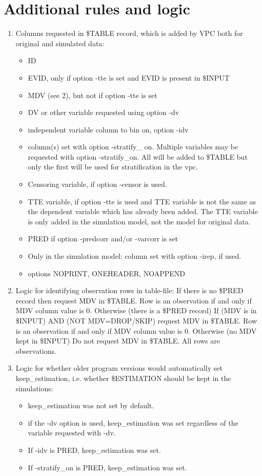 \section{Additional rules and logic}

\begin{enumerate}
	\item Columns requested in \$TABLE record, which is added by VPC both for original and simulated data:
	\begin{itemize}
		\item ID
		\item EVID, only if option -tte is set and EVID is present in \$INPUT
		\item MDV (see 2), but not if option -tte is set
		\item DV or other variable requested using option -dv
		\item independent variable column to bin on, option -idv
		\item column(s) set with option  -stratify\_ on. Multiple variables may be requested with option -stratify\_on. All will be added to \$TABLE but only the first will be used for stratification in the vpc.
		\item Censoring variable, if option -censor is used.
		\item TTE variable, if option -tte is used and TTE variable is not the same as the dependent variable which has already been added. The TTE variable is only added in the simulation model, not the model for original data.
        \item PRED if option -predcorr and/or -varcorr is set
        \item Only in the simulation model: column set with option -irep, if used.
		\item options NOPRINT, ONEHEADER, NOAPPEND
	\end{itemize}
	\item Logic for identifying observation rows  in table-file:
If there is no \$PRED record
	then request MDV in \$TABLE. Row is an observation if and only if MDV column value is 0.
Otherwise (there is a \$PRED record)
	If (MDV is in \$INPUT) AND (NOT MDV=DROP/SKIP)
		request MDV in \$TABLE. Row is an observation if and only if MDV column value is 0.
	Otherwise (no MDV kept in \$INPUT)
		Do not request MDV in \$TABLE. All rows are observations.
	\item Logic for whether older program versions would automatically set keep\_estimation, i.e. whether \$ESTIMATION should be kept in the simulations:
	\begin{itemize}
		\item keep\_estimation was not set by default.
		\item if the -dv option is used, keep\_estimation was set regardless of the variable requested with -dv.
		\item If -idv is PRED, keep\_estimation was set.
		\item If -stratify\_on is PRED, keep\_estimation was set.
	\end{itemize}
\end{enumerate}

